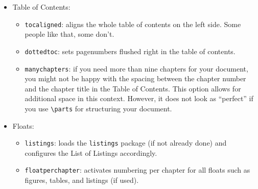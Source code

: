 \begin{itemize}
\begin{itemize}
            \item\texttt{pdfspacing}: makes use of pdftex' letter spacing
            capabilities via the \texttt{microtype} package.\footnote{Use 
            \texttt{microtype}'s \texttt{DVIoutput} option to generate
            DVI with pdftex.} This fixes some serious issues regarding 
            math formul\ae\ etc. (\eg, ``\ss'') in headers. 
            
            \item\texttt{minionprospacing}: uses the internal \texttt{textssc}
            command of the \texttt{MinionPro} package for letter spacing. This 
            automatically enables the \texttt{minionpro} option and overrides
            \texttt{pdfspacing}.
    
        \end{itemize}  

    \item Table of Contents:
        \begin{itemize}
             \item\texttt{tocaligned}: aligns the whole table of contents on
            the left side. Some people like that, some don't.
            
            \item\texttt{dottedtoc}: sets pagenumbers flushed right in the 
            table of contents.

            \item\texttt{manychapters}: if you need more than nine chapters for 
        your document, you might not be happy with the spacing between the 
        chapter number and the chapter title in the Table of Contents. 
        This option allows for additional space in this context. 
        However, it does not look as ``perfect'' if you use
        \verb|\parts| for structuring your document.
            
        \end{itemize}
    
    \item Floats:
        \begin{itemize}
    \item\texttt{listings}: loads the \texttt{listings} package (if not 
    already done) and configures the List of Listings accordingly.
    
    \item\texttt{floatperchapter}: activates numbering per chapter for
    all floats such as figures, tables, and listings (if used). 
    

\end{itemize}
\end{itemize}
